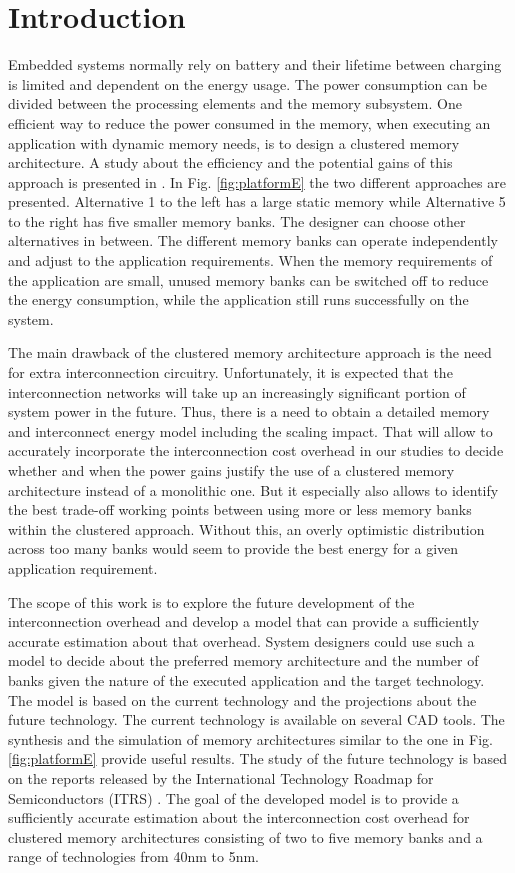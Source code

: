 \section{Introduction}

Embedded systems normally rely on battery and their lifetime between charging is limited and dependent on the energy usage.
The power consumption can be divided between the processing elements and the memory subsystem.
One efficient way to reduce the power consumed in the memory, when executing an application with dynamic memory needs, is to design a clustered memory architecture.
A study about the efficiency and the potential gains of this approach is presented in \cite{filippopoulos2013exploration}.
In Fig. \ref{fig:platformE} the two different approaches are presented.
Alternative 1 to the left has a large static memory while Alternative 5 to the right has five smaller memory banks. The designer can choose other alternatives in between.
The different memory banks can operate independently and  adjust to the application requirements.
When the memory requirements of the application are small, unused memory banks can be switched off to reduce the energy consumption, while the application still runs successfully on the system. 
 
 The main drawback of the clustered memory architecture approach is the need for extra interconnection circuitry.
 Unfortunately, it is expected that the interconnection networks will take up an increasingly significant portion of system power in the future. 
Thus, there is a need to obtain a detailed memory and interconnect energy model including the scaling impact. 
That will allow to accurately incorporate the interconnection cost overhead in our studies to decide whether and when the power gains justify the use of a clustered memory architecture instead of a monolithic one. 
But it especially also allows to identify the best trade-off working points between using more
or less memory banks within the clustered approach. 
Without this, an overly optimistic distribution across too many banks would seem to provide the best energy for a given application requirement.
  
  The scope of this work is to explore the future development of the interconnection overhead and develop a model that can provide a sufficiently accurate estimation about that overhead.
  System designers could use such a model to decide about the preferred memory architecture and the number of banks given the nature of the executed application and the target technology.
  The model is based on the current technology and the projections about the future technology.
  The current technology is available on several CAD tools.
  The synthesis and the simulation of memory architectures similar to the one in Fig. \ref{fig:platformE} provide useful results.
  The study of the future technology is based on the reports released by the International Technology Roadmap for Semiconductors (ITRS) \cite{itrs} .
 The goal of the developed model is to provide a sufficiently accurate estimation about the interconnection cost overhead for clustered memory architectures consisting of two to five memory banks and a range of technologies from 40nm to 5nm.  

